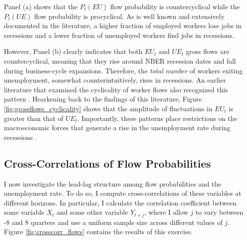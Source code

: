 \documentclass[12pt]{article}
\begin{document}
Panel (a) shows that the $P_t(EU)$ flow probability is countercyclical while the $P_t(UE)$ flow probability is procyclical. As is well known and extensively documented in the literature, a higher fraction of employed workers lose jobs in recessions and a lower fraction of unemployed workers find jobs in recessions.

However, Panel (b) clearly indicates that both $EU_t$ and $UE_t$ gross flows are countercyclical, meaning that they rise around NBER recession dates and fall during business-cycle expansions. Therefore, the \textit{total number} of workers exiting unemployment, somewhat counterintuitively, rises in recessions. An earlier literature that examined the cyclicality of worker flows also recognized this pattern \citep{Darby:1986aa, Davis:1987aa, Blanchard:1990aa, Ritter:1993aa}. Hearkening back to the findings of this literature, Figure \ref{fig:grossflows_cyclicality} shows that the amplitude of fluctuations in $EU_t$ is greater than that of $UE_t$. Importantly, these patterns place restrictions on the macroeconomic forces that generate a rise in the unemployment rate during recessions \citep{Fujita:2011aa, Mercan:2024aa}.

\subsection{Cross-Correlations of Flow Probabilities}

I now investigate the lead-lag structure among flow probabilities and the unemployment rate. To do so, I compute cross-correlations of these variables at different horizons. In particular, I calculate the correlation coefficient between some variable $X_t$ and some other variable $Y_{t + j}$, where I allow $j$ to vary between -8 and 8 quarters and use a uniform sample size across different values of $j$. Figure \ref{fig:crosscorr_flows} contains the results of this exercise.
\end{document}

